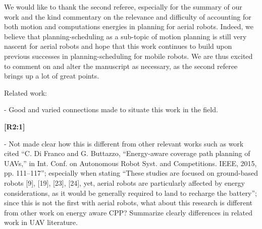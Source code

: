 \documentclass[10pt]{letter}
\begin{document}
{\color{blue} 


{\hspace*{-4.5em}{[R2]}\vspace*{-1.9em}}

We would like to thank the second referee, especially for the summary of our work and the kind commentary on the relevance and difficulty of accounting for both motion and computations energies in planning for aerial robots. Indeed, we believe that planning-scheduling as a sub-topic of motion planning is still very nascent for aerial robots and hope that this work continues to build upon previous successes in planning-scheduling for mobile robots. We are thus excited to comment on and alter the manuscript as necessary, as the second referee brings up a lot of great points.


}

\vspace{2em}

Related work:

- Good and varied connections made to situate this work in the field. 

{\hspace*{-4.5em}\textbf{[R2:1]}\vspace*{-1.9em}}

- Not made clear how this is different from other relevant works such as work cited ``C. Di Franco and G. Buttazzo, ``Energy-aware coverage path planning of UAVs,'' in Int. Conf. on Autonomous Robot Syst. and Competitions. IEEE, 2015, pp. 111–117''; especially when stating ``These studies are focused on ground-based robots [9], [19], [23], [24], yet, aerial robots are particularly affected by energy considerations, as it would be generally required to land to recharge the battery''; since this is not the first with aerial robots, what about this research is different from other work on energy aware CPP? Summarize clearly differences in related work in UAV literature.
\end{document}
